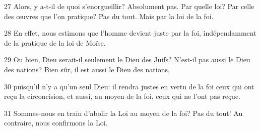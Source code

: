 
27 Alors, y a-t-il de quoi s'enorgueillir? Absolument pas. Par quelle loi? Par celle des œuvres que l’on pratique? Pas du tout. Mais par la loi de la foi.

28 En effet, nous estimons que l’homme devient juste par la foi, indépendamment de la pratique de la loi de Moïse.

29 Ou bien, Dieu serait-il seulement le Dieu des Juifs? N’est-il pas aussi le Dieu des nations? Bien sûr, il est aussi le Dieu des nations,

30 puisqu’il n’y a qu’un seul Dieu: il rendra justes en vertu de la foi ceux qui ont reçu la circoncision, et aussi, au moyen de la foi, ceux qui ne l’ont pas reçue.

31 Sommes-nous en train d’abolir la Loi au moyen de la foi? Pas du tout! Au contraire, nous confirmons la Loi.